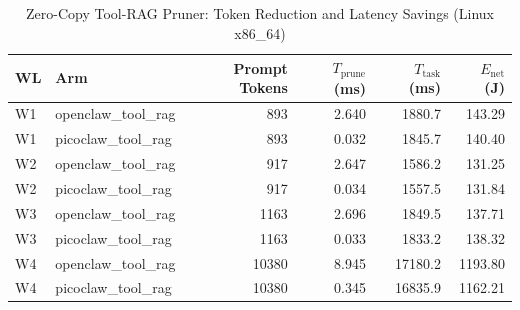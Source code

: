 \begin{table}[t]
\centering\small
\caption{Zero-Copy Tool-RAG Pruner: Token Reduction and Latency Savings (Linux x86_64)}
\label{tab:linux_tool_rag}
\begin{tabular}{llrrrr}
\toprule
WL & Arm & Prompt Tokens & $T_{\text{prune}}$ (ms) & $T_{\text{task}}$ (ms) & $E_{\text{net}}$ (J) \\
\midrule
W1 & openclaw\_tool\_rag & 893 & 2.640 & 1880.7 & 143.29 \\
W1 & picoclaw\_tool\_rag & 893 & 0.032 & 1845.7 & 140.40 \\
W2 & openclaw\_tool\_rag & 917 & 2.647 & 1586.2 & 131.25 \\
W2 & picoclaw\_tool\_rag & 917 & 0.034 & 1557.5 & 131.84 \\
W3 & openclaw\_tool\_rag & 1163 & 2.696 & 1849.5 & 137.71 \\
W3 & picoclaw\_tool\_rag & 1163 & 0.033 & 1833.2 & 138.32 \\
W4 & openclaw\_tool\_rag & 10380 & 8.945 & 17180.2 & 1193.80 \\
W4 & picoclaw\_tool\_rag & 10380 & 0.345 & 16835.9 & 1162.21 \\
\bottomrule
\end{tabular}
\end{table}
